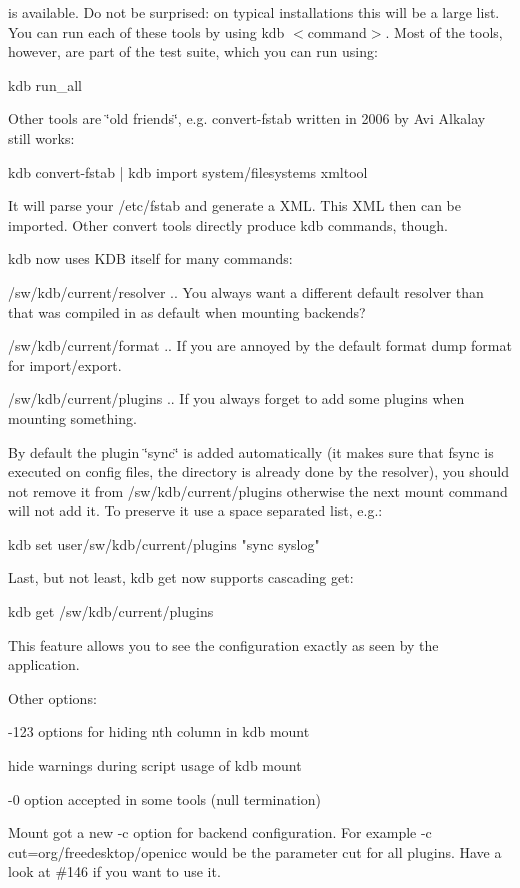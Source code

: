is available. Do not be surprised\+: on typical installations this will be a large list. You can run each of these tools by using kdb $<$command$>$. Most of the tools, however, are part of the test suite, which you can run using\+: \begin{DoxyVerb}kdb run_all
\end{DoxyVerb}


Other tools are \char`\"{}old friends\char`\"{}, e.\+g. convert-\/fstab written in 2006 by Avi Alkalay still works\+: \begin{DoxyVerb}kdb convert-fstab | kdb import system/filesystems xmltool
\end{DoxyVerb}


It will parse your /etc/fstab and generate a X\+ML. This X\+ML then can be imported. Other convert tools directly produce kdb commands, though.

kdb now uses K\+DB itself for many commands\+:


\begin{DoxyItemize}
\item /sw/kdb/current/resolver .. You always want a different default resolver than that was compiled in as default when mounting backends?
\item /sw/kdb/current/format .. If you are annoyed by the default format dump format for import/export.
\item /sw/kdb/current/plugins .. If you always forget to add some plugins when mounting something.
\end{DoxyItemize}

By default the plugin \char`\"{}sync\char`\"{} is added automatically (it makes sure that fsync is executed on config files, the directory is already done by the resolver), you should not remove it from /sw/kdb/current/plugins otherwise the next mount command will not add it. To preserve it use a space separated list, e.\+g.\+: \begin{DoxyVerb}kdb set user/sw/kdb/current/plugins "sync syslog"
\end{DoxyVerb}


Last, but not least, kdb get now supports cascading get\+: \begin{DoxyVerb}kdb get /sw/kdb/current/plugins
\end{DoxyVerb}


This feature allows you to see the configuration exactly as seen by the application.

Other options\+:


\begin{DoxyItemize}
\item -\/123 options for hiding nth column in {\ttfamily kdb mount}
\item hide warnings during script usage of {\ttfamily kdb mount}
\item -\/0 option accepted in some tools (null termination)
\item Mount got a new -\/c option for backend configuration. For example -\/c cut=org/freedesktop/openicc would be the parameter cut for all plugins. Have a look at \#146 if you want to use it.
\end{DoxyItemize}

